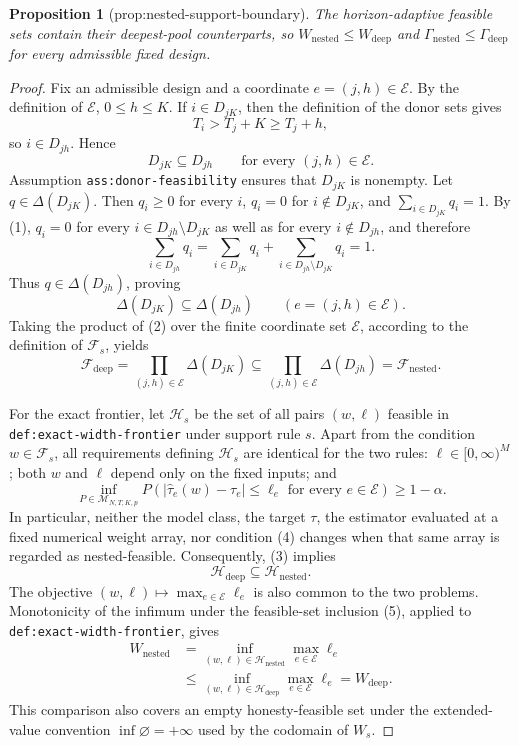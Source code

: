 \documentclass{article}
\newtheorem{proposition}{Proposition}
\begin{document}
\begin{proposition}[prop:nested-support-boundary]\label{prop:nested-support-boundary}
The horizon-adaptive feasible sets contain their deepest-pool counterparts, so \(W_{\mathrm{nested}}\le W_{\mathrm{deep}}\) and \(\Gamma_{\mathrm{nested}}\le\Gamma_{\mathrm{deep}}\) for every admissible fixed design.
\end{proposition}
\begin{proof}
Fix an admissible design and a coordinate \(e=(j,h)\in\mathcal E\).  By the definition of \(\mathcal E\), \(0\leq h\leq K\).  If \(i\in D_{jK}\), then the definition of the donor sets gives
\[
 T_i>T_j+K\geq T_j+h,
\]
so \(i\in D_{jh}\).  Hence
\[
 D_{jK}\subseteq D_{jh}
 \qquad\text{for every }(j,h)\in\mathcal E. \tag{1}
\]
Assumption \texttt{ass:donor-feasibility} ensures that \(D_{jK}\) is nonempty.  Let \(q\in\Delta(D_{jK})\).  Then \(q_i\geq0\) for every \(i\), \(q_i=0\) for \(i\notin D_{jK}\), and \(\sum_{i\in D_{jK}}q_i=1\).  By (1), \(q_i=0\) for every \(i\in D_{jh}\setminus D_{jK}\) as well as for every \(i\notin D_{jh}\), and therefore
\[
 \sum_{i\in D_{jh}}q_i
 =\sum_{i\in D_{jK}}q_i
  +\sum_{i\in D_{jh}\setminus D_{jK}}q_i
 =1.
\]
Thus \(q\in\Delta(D_{jh})\), proving
\[
 \Delta(D_{jK})\subseteq\Delta(D_{jh})
 \qquad(e=(j,h)\in\mathcal E). \tag{2}
\]
Taking the product of (2) over the finite coordinate set \(\mathcal E\), according to the definition of \(\mathcal F_s\), yields
\[
 \mathcal F_{\mathrm{deep}}
 =\prod_{(j,h)\in\mathcal E}\Delta(D_{jK})
 \subseteq
 \prod_{(j,h)\in\mathcal E}\Delta(D_{jh})
 =\mathcal F_{\mathrm{nested}}. \tag{3}
\]

For the exact frontier, let \(\mathcal H_s\) be the set of all pairs \((w,\ell)\) feasible in \texttt{def:exact-width-frontier} under support rule \(s\).  Apart from the condition \(w\in\mathcal F_s\), all requirements defining \(\mathcal H_s\) are identical for the two rules: \(\ell\in[0,\infty)^M\); both \(w\) and \(\ell\) depend only on the fixed inputs; and
\[
 \inf_{P\in\mathcal M_{N,T,K,p}}
 P\!\left(
   \left|\widehat\tau_e(w)-\tau_e\right|\leq\ell_e
   \text{ for every }e\in\mathcal E
 \right)\geq1-\alpha. \tag{4}
\]
In particular, neither the model class, the target \(\tau\), the estimator evaluated at a fixed numerical weight array, nor condition (4) changes when that same array is regarded as nested-feasible.  Consequently, (3) implies
\[
 \mathcal H_{\mathrm{deep}}\subseteq\mathcal H_{\mathrm{nested}}. \tag{5}
\]
The objective \((w,\ell)\mapsto\max_{e\in\mathcal E}\ell_e\) is also common to the two problems.  Monotonicity of the infimum under the feasible-set inclusion (5), applied to \texttt{def:exact-width-frontier}, gives
\[
 \begin{aligned}
 W_{\mathrm{nested}}
 &=\inf_{(w,\ell)\in\mathcal H_{\mathrm{nested}}}
       \max_{e\in\mathcal E}\ell_e \\
 &\leq\inf_{(w,\ell)\in\mathcal H_{\mathrm{deep}}}
       \max_{e\in\mathcal E}\ell_e
 =W_{\mathrm{deep}}. \tag{6}
 \end{aligned}
\]
This comparison also covers an empty honesty-feasible set under the extended-value convention \(\inf\varnothing=+\infty\) used by the codomain of \(W_s\).


\end{proof}
\end{document}
